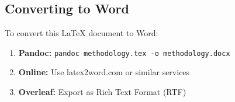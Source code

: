 \documentclass[12pt,a4paper]{article}
\begin{document}
\subsection{Converting to Word}

To convert this LaTeX document to Word:

\begin{enumerate}
    \item \textbf{Pandoc:} \texttt{pandoc methodology.tex -o methodology.docx}
    \item \textbf{Online:} Use latex2word.com or similar services
    \item \textbf{Overleaf:} Export as Rich Text Format (RTF)
\end{enumerate}

\end{document}
